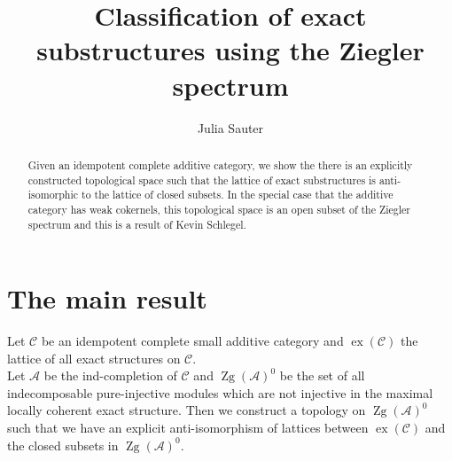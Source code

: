 \documentclass[11pt,a4paper]{amsart}
\theoremstyle{plain}
\theoremstyle{definition}
\newcommand{\mcA}{\mathcal{A}}
\newcommand{\mcC}{\mathcal{C}}
\DeclareMathOperator{\exact}{ex}
\DeclareMathOperator{\Zg}{Zg}
\begin{document}
\title{Classification of exact substructures using the Ziegler spectrum}
\author{Julia Sauter}
\address{Julia Sauter\\ Faculty of Mathematics \\
Bielefeld University \\
PO Box 100 131\\
D-33501 Bielefeld }



\begin{abstract}
Given an idempotent complete additive category, we show the there is an explicitly constructed topological space such that the lattice of exact substructures is anti-isomorphic to the lattice of closed subsets. 
In the special case that the additive category has weak cokernels, this topological space is an open subset of the Ziegler spectrum and this is a result of Kevin Schlegel.    
\end{abstract}


\maketitle

\section{The main result}

Let $\mcC$ be an idempotent complete small additive category and $\exact (\mcC )$ the lattice of all exact structures on $\mcC$. \\
Let $\mcA$ be the ind-completion of $\mcC$ and $\Zg (\mcA)^{0}$ be the set of all indecomposable pure-injective modules which are not injective in the maximal locally coherent exact structure. 
Then we construct a topology on $\Zg(\mcA)^0$ such that we have an explicit anti-isomorphism of lattices between $\exact (\mcC )$ and the closed subsets in $\Zg(\mcA)^0$.  
\end{document}
